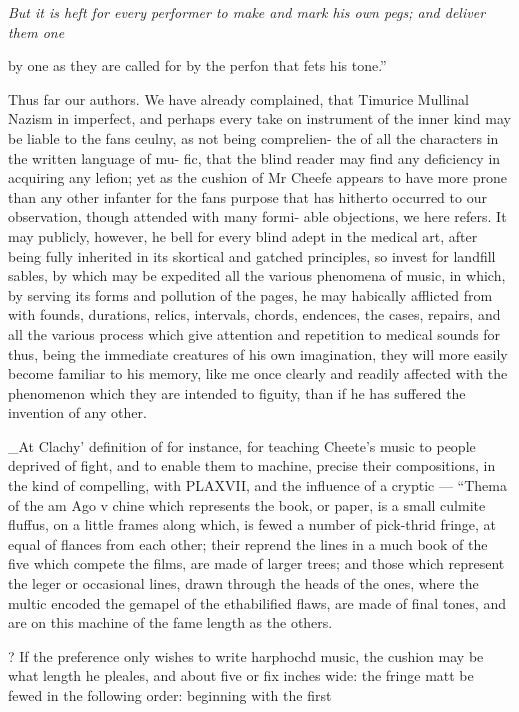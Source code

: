 {\small\itshape * But it is heft for every performer to make and mark his own pegs; and deliver them one\par}\medskip
by one as they are called for by the perfon that fets his tone.”\par\medskip
Thus far our authors. We have already complained, that Timurice Mullinal Nazism in imperfect, and perhaps every take on instrument of the inner kind may be liable to the fans ceulny, as not being comprelien- the of all the characters in the written language of mu- fic, that the blind reader may find any deficiency in acquiring any lefion; yet as the cushion of Mr Cheefe appears to have more prone than any other infanter for the fans purpose that has hitherto occurred to our observation, though attended with many formi- able objections, we here refers. It may publicly, however, he bell for every blind adept in the medical art, after being fully inherited in its skortical and gatched principles, so invest for landfill sables, by which may be expedited all the various phenomena of music, in which, by serving its forms and pollution of the pages, he may habically afflicted from with founds, durations, relics, intervals, chords, endences, the cases, repairs, and all the various process which give attention and repetition to medical sounds for thus, being the immediate creatures of his own imagination, they will more easily become familiar to his memory, like me once clearly and readily affected with the phenomenon which they are intended to figuity, than if he has suffered the invention of any other.\par\medskip
\_At Clachy’ definition of for instance, for teaching Cheete's music to people deprived of fight, and to enable them to machine, precise their compositions, in the kind of compelling, with PLAXVII, and the influence of a cryptic — “Thema of the am Ago v chine which represents the book, or paper, is a small culmite fluffus, on a little frames along which, is fewed a number of pick-thrid fringe, at equal of flances from each other; their reprend the lines in a much book of the five which compete the films, are made of larger trees; and those which represent the leger or occasional lines, drawn through the heads of the ones, where the multic encoded the gemapel of the ethabilified flaws, are made of final tones, and are on this machine of the fame length as the others.\par\medskip
? If the preference only wishes to write harphochd music, the cushion may be what length he pleales, and about five or fix inches wide: the fringe matt be fewed in the following order: beginning with the first\par{}\par\medskip
